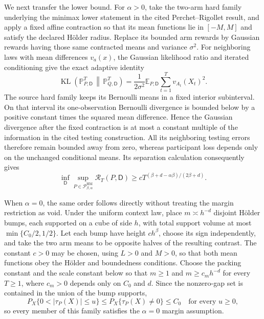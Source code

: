 We next transfer the lower bound.  For \(\alpha>0\), take the two-arm hard family underlying the minimax lower statement in the cited Perchet--Rigollet result, and apply a fixed affine contraction so that its mean functions lie in \([-M,M]\) and satisfy the declared H\"older radius.  Replace its bounded arm rewards by Gaussian rewards having those same contracted means and variance \(\sigma^2\).  For neighboring laws with mean differences \(v_a(x)\), the Gaussian likelihood ratio and iterated conditioning give the exact adaptive identity
\[
 \operatorname{KL}\!\left(
 \mathbb P_{P,\mathsf D}^{T}\,\middle\|\,
 \mathbb P_{Q,\mathsf D}^{T}\right)
 =\frac{1}{2\sigma^2}
 \mathbb E_{P,\mathsf D}\sum_{t=1}^T v_{A_t}(X_t)^2.
\]
The source hard family keeps its Bernoulli means in a fixed interior subinterval.  On that interval its one-observation Bernoulli divergence is bounded below by a positive constant times the squared mean difference.  Hence the Gaussian divergence after the fixed contraction is at most a constant multiple of the information in the cited testing construction.  All its neighboring testing errors therefore remain bounded away from zero, whereas participant loss depends only on the unchanged conditional means.  Its separation calculation consequently gives
\[
 \inf_{\mathsf D}\sup_{P\in\mathcal P_{\beta,\alpha}^{\mathrm{HM}}}
 \mathcal R_T(P,\mathsf D)
 \geq cT^{(\beta+d-\alpha\beta)/(2\beta+d)}.
\]

When \(\alpha=0\), the same order follows directly without treating the margin restriction as void.  Under the uniform context law, place \(m\asymp h^{-d}\) disjoint H\"older bumps, each supported on a cube of side \(h\), with total support volume at most \(\min\{C_0/2,1/2\}\).  Let each bump have height \(ch^\beta\), choose its sign independently, and take the two arm means to be opposite halves of the resulting contrast.  The constant \(c>0\) may be chosen, using \(L>0\) and \(M>0\), so that both mean functions obey the H\"older and boundedness conditions.  Choose the packing constant and the scale constant below so that \(m\geq1\) and \(m\geq c_mh^{-d}\) for every \(T\geq1\), where \(c_m>0\) depends only on \(C_0\) and \(d\).  Since the nonzero-gap set is contained in the union of the bump supports,
\[
 P_X\{0<|\tau_P(X)|\leq u\}
 \leq P_X\{\tau_P(X)\ne0\}\leq C_0
 \quad\text{for every }u\geq0,
\]
so every member of this family satisfies the \(\alpha=0\) margin assumption.

